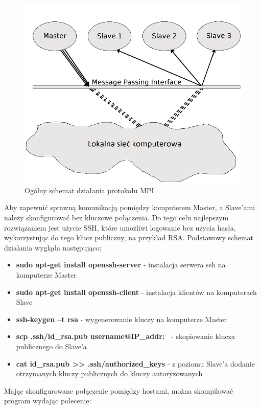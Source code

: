 \documentclass[a4paper,12pt]{article}		%
\begin{document}
\begin{figure}[h!]
\centering
\includegraphics[scale=0.6]{Resources/mpi.jpg}
\caption{Ogólny schemat działania protokołu MPI.} 
\end{figure}

Aby zapewnić sprawną komunikacją pomiędzy komputerem Master, a Slave’ami należy skonfigurować bez kluczowe połączenia. Do tego celu najlepszym rozwiązaniem jest użycie SSH, które umożliwi logowanie bez użycia hasła, wykorzystując do tego klucz publiczny, na przykład RSA. Podstawowy schemat działania wygląda następująco:

\begin{itemize}
\item \textbf{sudo apt-get install openssh-server} - instalacja serwera ssh na komputerze Master
\item \textbf{sudo apt-get install openssh-client} - instalacja klientów na komputerach Slave
\item \textbf{ssh-keygen –t rsa} - wygenerowanie kluczy na komputerze Master
\item \textbf{scp .ssh/id\_rsa.pub username@IP\_addr:~} - skopiowanie klucza publicznego do Slave'a
\item \textbf{cat id\_rsa.pub >> .ssh/authorized\_keys} - z poziomu Slave'a dodanie otrzymanych kluczy publicznych do  kluczy autoryzowanych
\end{itemize}

Mając skonfigurowane połączenie pomiędzy hostami, można skompilować program wydając polecenie: 
\end{document}
